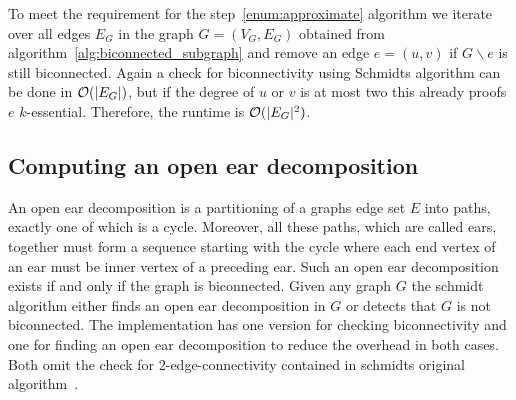 To meet the requirement for the step~\ref{enum:approximate} algorithm we iterate over all edges \(E_G\) in the graph \(G = (V_G, E_G)\) obtained from algorithm~\ref{alg:biconnected_subgraph} and remove an edge \(e = (u, v)\) if \(G \backslash e\) is still biconnected. Again a check for biconnectivity using Schmidts algorithm can be done in \(\mathcal{O}(\vert E_G \vert)\), but if the degree of \(u\) or \(v\) is at most two this already proofs \(e\) \(k\)-essential. Therefore, the runtime is \(\mathcal{O}(\vert {E_G} \vert^2)\).

\subsection{Computing an open ear decomposition}\label{subsec:open_ear_decomposition}

An open ear decomposition is a partitioning of a graphs edge set \(E\) into paths, exactly one of which is a cycle. Moreover, all these paths, which are called ears, together must form a sequence starting with the cycle where each end vertex of an ear must be inner vertex of a preceding ear.
Such an open ear decomposition exists if and only if the graph is biconnected.
Given any graph \(G\) the schmidt algorithm either finds an open ear decomposition in \(G\) or detects that \(G\) is not biconnected. The implementation has one version for checking biconnectivity and one for finding an open ear decomposition to reduce the overhead in both cases. Both omit the check for \(2\)-edge-connectivity contained in schmidts original algorithm~\cite{schmidt2013}.

